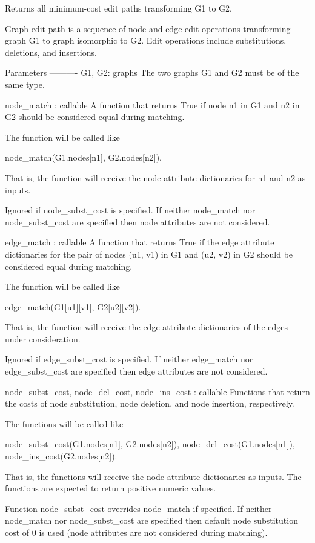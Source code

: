 \begin{DoxyVerb}Returns all minimum-cost edit paths transforming G1 to G2.

Graph edit path is a sequence of node and edge edit operations
transforming graph G1 to graph isomorphic to G2.  Edit operations
include substitutions, deletions, and insertions.

Parameters
----------
G1, G2: graphs
    The two graphs G1 and G2 must be of the same type.

node_match : callable
    A function that returns True if node n1 in G1 and n2 in G2
    should be considered equal during matching.

    The function will be called like

       node_match(G1.nodes[n1], G2.nodes[n2]).

    That is, the function will receive the node attribute
    dictionaries for n1 and n2 as inputs.

    Ignored if node_subst_cost is specified.  If neither
    node_match nor node_subst_cost are specified then node
    attributes are not considered.

edge_match : callable
    A function that returns True if the edge attribute dictionaries
    for the pair of nodes (u1, v1) in G1 and (u2, v2) in G2 should
    be considered equal during matching.

    The function will be called like

       edge_match(G1[u1][v1], G2[u2][v2]).

    That is, the function will receive the edge attribute
    dictionaries of the edges under consideration.

    Ignored if edge_subst_cost is specified.  If neither
    edge_match nor edge_subst_cost are specified then edge
    attributes are not considered.

node_subst_cost, node_del_cost, node_ins_cost : callable
    Functions that return the costs of node substitution, node
    deletion, and node insertion, respectively.

    The functions will be called like

       node_subst_cost(G1.nodes[n1], G2.nodes[n2]),
       node_del_cost(G1.nodes[n1]),
       node_ins_cost(G2.nodes[n2]).

    That is, the functions will receive the node attribute
    dictionaries as inputs.  The functions are expected to return
    positive numeric values.

    Function node_subst_cost overrides node_match if specified.
    If neither node_match nor node_subst_cost are specified then
    default node substitution cost of 0 is used (node attributes
    are not considered during matching).


\end{DoxyVerb}
